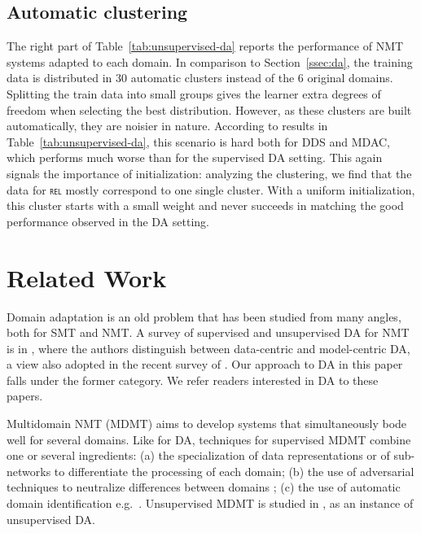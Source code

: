 \documentclass[11pt]{article}
\newcommand{\domain}[1]{\texttt{\textsc{#1}}}
\begin{document}
\subsection{Automatic clustering}\label{ssec:clda}
The right part of Table~\ref{tab:unsupervised-da} reports the performance of NMT systems adapted to each domain.
In comparison to Section~\ref{ssec:da}, the training data is distributed in 30 automatic clusters instead of the 6 original domains. Splitting the train data into small groups gives the learner extra degrees of freedom when selecting the best distribution. However, as these clusters are built automatically, they are noisier in nature. According to results in Table~\ref{tab:unsupervised-da}, this scenario is hard both for DDS and MDAC, which performs much worse than for the supervised DA setting. This again signals the importance of initialization: analyzing the clustering, we find that the data for \domain{rel} mostly correspond to one single cluster. With a uniform initialization, this cluster starts with a small weight and never succeeds in matching the good performance observed in the DA setting.

\section{Related Work \label{sec:related}}

Domain adaptation is an old problem that has been studied from many angles, both for SMT and NMT. A survey of supervised and unsupervised DA for NMT is in \cite{Chu2017comparison}, where the authors distinguish between data-centric and model-centric DA, a view also adopted in the recent survey of . Our approach to DA in this paper falls under the former category. We refer readers interested in DA to these papers.

Multidomain NMT (MDMT) aims to develop systems that simultaneously bode well for several domains. Like for DA, techniques for supervised MDMT combine one or several ingredients: (a) the specialization of data representations \cite{Kobus17domaincontrol} or of sub-networks \cite{Pham19generic} to differentiate the processing of each domain; (b) the use of adversarial techniques to neutralize differences between domains \cite{Britz17mixing,Zeng18multidomain}; (c) the use of automatic domain identification e.g.\ . Unsupervised MDMT is studied in , as an instance of unsupervised DA.
\end{document}
